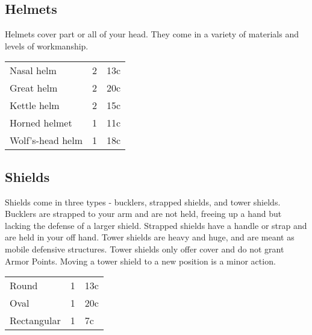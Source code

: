 \subsection{Helmets}

Helmets cover part or all of your head. They come in a variety
of materials and levels of workmanship.

\begin{center}
{
\begin{xtabular}{|l|l|l|}
Nasal helm & 2 & 13c \\
Great helm & 2 & 20c \\
Kettle helm & 2 & 15c \\
Horned helmet & 1 & 11c \\
Wolf's-head helm & 1 & 18c \\
\hline
\end{xtabular}
}
\end{center}

\subsection{Shields}

Shields come in three types - bucklers, strapped shields, and
tower shields. Bucklers are strapped to your arm and are not
held, freeing up a hand but lacking the defense of a larger
shield. Strapped shields have a handle or strap and are held
in your off hand. Tower shields are heavy and huge, and are
meant as mobile defensive structures. Tower shields only offer
cover and do not grant Armor Points. Moving a tower shield to
a new position is a minor action.

\begin{center}
{
\begin{xtabular}{|l|l|l|}
Round & 1 & 13c \\
Oval & 1 & 20c \\
Rectangular & 1 & 7c \\
\hline
\end{xtabular}
}
\end{center}


